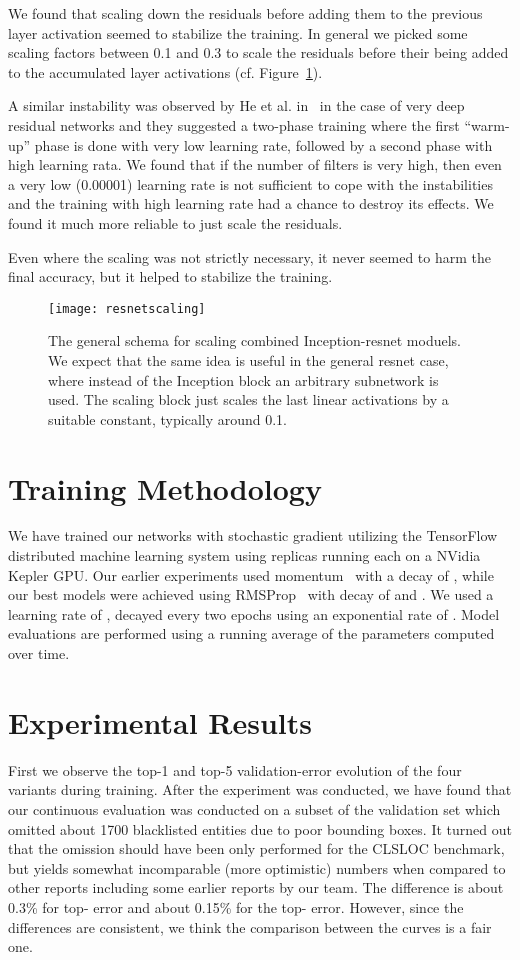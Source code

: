 \documentclass[10pt,twocolumn,letterpaper]{article}
\begin{document}
We found that scaling down the residuals before adding them to
the previous layer activation seemed to stabilize the training. In general
we picked some scaling factors between 0.1 and 0.3 to scale the residuals
before their being added to the accumulated layer activations
(cf. Figure~\ref{fig:resnetscaling}).

A similar instability was observed by He et al. in~\cite{he2015deep} in
the case of very deep residual networks and they suggested a two-phase
training where the first ``warm-up'' phase is done with very low learning
rate, followed by a second phase with high learning rata. We found that
if the number of filters is very high, then even a very low (0.00001) learning
rate is not sufficient to cope with the instabilities and the training with
high learning rate had a chance to destroy its effects. We found it much
more reliable to just scale the residuals.

Even where the scaling was not strictly necessary, it never
seemed to harm the final accuracy, but it helped to stabilize the training.
\begin{figure}
\centering
\texttt{[image: resnetscaling]}
\caption{The general schema for scaling combined Inception-resnet moduels.
  We expect that the same idea is useful in the general resnet case, where
instead of the Inception block an arbitrary subnetwork is used. The scaling
block just scales the last linear activations by a suitable constant, typically
around 0.1.}
\label{fig:resnetscaling}
\end{figure}
 \section{Training Methodology}
We have trained our networks with stochastic gradient utilizing the
TensorFlow~\cite{tensorflow2015-whitepaper} distributed machine learning system
using  replicas running each on a NVidia Kepler GPU.
Our earlier experiments used momentum~\cite{icml2013_sutskever13} with a
decay of , while our best models were achieved using RMSProp~\cite{rmsprop}
with decay of  and . We used a learning rate of ,
decayed every two epochs using an exponential rate of .
Model evaluations are performed using a running average of the parameters
computed over time.
 \section{Experimental Results}

First we observe the top-1 and top-5 validation-error evolution of the
four variants during training. After the experiment was conducted, we have
found that our continuous evaluation was conducted on a subset of the
validation set which omitted about 1700 blacklisted entities due to poor
bounding boxes. It turned out that the omission should have been only performed
for the CLSLOC benchmark, but yields somewhat incomparable (more optimistic)
numbers when compared to other reports including some earlier reports by our
team. The difference is about 0.3\% for top- error and about 0.15\% for
the top- error. However, since the differences are consistent, we think
the comparison between the curves is a fair one.
\end{document}
